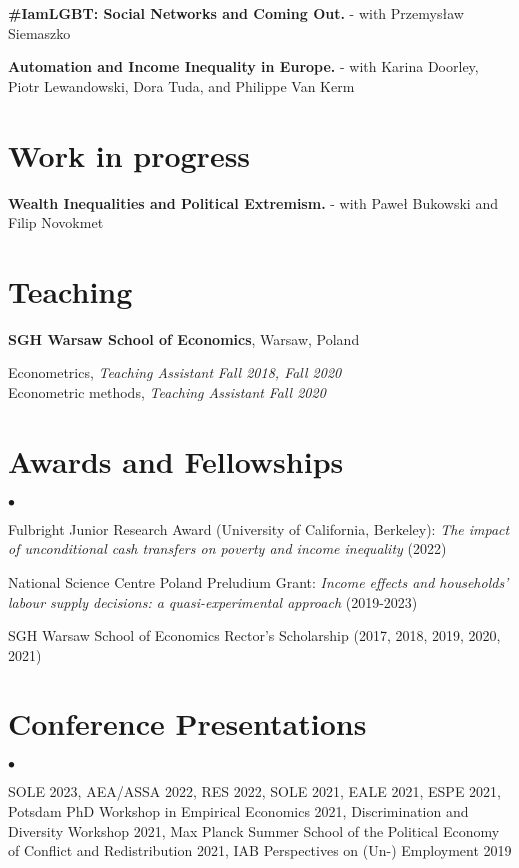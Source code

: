 \documentclass[margin,line]{res}
\newenvironment{list2}{
  \begin{list}{$\bullet$}{%
      \setlength{\itemsep}{0in}
      \setlength{\parsep}{0in} \setlength{\parskip}{0in}
      \setlength{\topsep}{0in} \setlength{\partopsep}{0in} 
      \setlength{\leftmargin}{0.2in}}}{\end{list}}
\begin{document}
\begin{resume}
\textbf{\#IamLGBT: Social Networks and Coming Out.} - with Przemysław Siemaszko 

\textbf{Automation and Income Inequality in Europe.} - with Karina Doorley, Piotr Lewandowski, Dora Tuda, and Philippe Van Kerm 

\vspace*{.05in} 

\section{\sc Work in progress}

\textbf{Wealth Inequalities and Political Extremism.} - with Paweł Bukowski and Filip Novokmet

\vspace*{.05in} 

\section{\sc Teaching}
{\bf SGH Warsaw School of Economics}, Warsaw, Poland

\vspace{-.3cm}
Econometrics, \textit{Teaching Assistant} \hfill \textit{Fall 2018, Fall 2020}\\
Econometric methods, \textit{Teaching Assistant} \hfill \textit{Fall 2020}\\

\vspace*{.05in}  
\section{\sc Awards and Fellowships} 
\begin{list2}
\item Fulbright Junior Research Award (University of California, Berkeley): \textit{The impact of unconditional cash transfers on poverty and income inequality} (2022)
\item National Science Centre Poland Preludium Grant: \textit{Income effects and households' labour supply decisions: a quasi-experimental approach} (2019-2023)
\item SGH Warsaw School of Economics Rector's Scholarship (2017, 2018, 2019, 2020, 2021)
\end{list2}
\vspace*{.05in} 
\section{\sc Conference Presentations} 
\begin{list2}
	\item SOLE 2023, AEA/ASSA 2022, RES 2022, SOLE 2021, EALE 2021, ESPE 2021, Potsdam PhD Workshop in Empirical Economics 2021, Discrimination and Diversity Workshop 2021, Max Planck Summer School of the Political Economy of Conflict and Redistribution 2021, IAB Perspectives on (Un-) Employment 2019 
\end{list2}
\vspace*{.05in} 

\end{resume}
\end{document}

